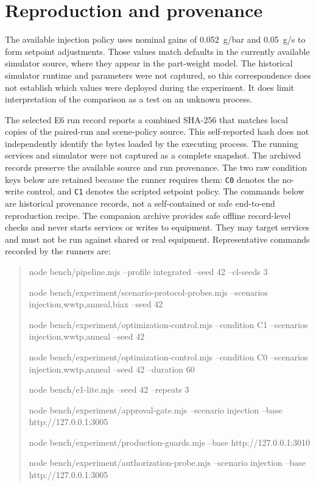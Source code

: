 \documentclass[10pt]{article}
\begin{document}
\section*{Reproduction and provenance}

The available injection policy uses nominal gains of 0.052~g/bar and 0.05~g/s to form setpoint adjustments. Those values match defaults in the currently available simulator source, where they appear in the part-weight model. The historical simulator runtime and parameters were not captured, so this correspondence does not establish which values were deployed during the experiment. It does limit interpretation of the comparison as a test on an unknown process.

The selected E6 run record reports a combined SHA-256 that matches local copies of the paired-run and scene-policy source. This self-reported hash does not independently identify the bytes loaded by the executing process. The running services and simulator were not captured as a complete snapshot. The archived records preserve the available source and run provenance. The two raw condition keys below are retained because the runner requires them: \texttt{C0} denotes the no-write control, and \texttt{C1} denotes the scripted setpoint policy. The commands below are historical provenance records, not a self-contained or safe end-to-end reproduction recipe. The companion archive provides safe offline record-level checks and never starts services or writes to equipment. They may target services and must not be run against shared or real equipment. Representative commands recorded by the runners are:
\begin{quote}
\footnotesize\ttfamily\raggedright
node bench/pipeline.mjs --profile integrated --seed 42 --cl-seeds 3\par\smallskip
node bench/experiment/scenario-protocol-probes.mjs --scenarios injection,wwtp,anneal,biax --seed 42\par\smallskip
node bench/experiment/optimization-control.mjs --condition C1 --scenarios injection,wwtp,anneal --seed 42\par\smallskip
node bench/experiment/optimization-control.mjs --condition C0 --scenarios injection,wwtp,anneal --seed 42 --duration 60\par\smallskip
node bench/e1-lite.mjs --seed 42 --repeats 3\par\smallskip
node bench/experiment/approval-gate.mjs --scenario injection --base http://127.0.0.1:3005\par\smallskip
node bench/experiment/production-guards.mjs --base http://127.0.0.1:3010\par\smallskip
node bench/experiment/authorization-probe.mjs --scenario injection --base http://127.0.0.1:3005
\end{quote}
\end{document}
